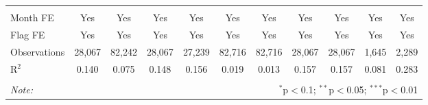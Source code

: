 \begin{table}[!htbp]
\begin{tabular}{@{\extracolsep{1pt}}lcccccccccc}
  & & & & & & & & & & \\ 
\hline \\[-1.8ex] 
Month FE & Yes & Yes & Yes & Yes & Yes & Yes & Yes & Yes & Yes & Yes \\ 
Flag FE & Yes & Yes & Yes & Yes & Yes & Yes & Yes & Yes & Yes & Yes \\ 
Observations & 28,067 & 82,242 & 28,067 & 27,239 & 82,716 & 82,716 & 28,067 & 28,067 & 1,645 & 2,289 \\ 
R$^{2}$ & 0.140 & 0.075 & 0.148 & 0.156 & 0.019 & 0.013 & 0.157 & 0.157 & 0.081 & 0.283 \\ 
\hline 
\hline \\[-1.8ex] 
\textit{Note:}  & \multicolumn{10}{r}{$^{*}$p$<$0.1; $^{**}$p$<$0.05; $^{***}$p$<$0.01} \\ 
\end{tabular} 
\end{table} 
